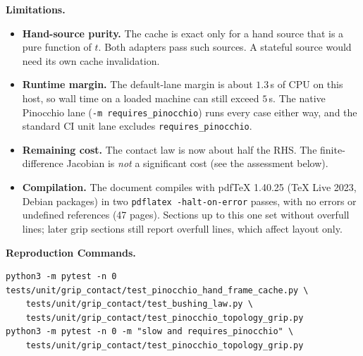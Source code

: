 \documentclass[11pt,a4paper]{article}
\begin{document}
\textbf{Limitations.}
\begin{itemize}[leftmargin=*,noitemsep]
\item \textbf{Hand-source purity.} The cache is exact only for a hand source that is a pure function of $t$. Both
  adapters pass such sources. A stateful source would need its own cache invalidation.
\item \textbf{Runtime margin.} The default-lane margin is about $1.3$\,s of CPU on this host, so wall time on a loaded
  machine can still exceed $5$\,s. The native Pinocchio lane (\texttt{-m requires\_pinocchio}) runs every case either
  way, and the standard CI unit lane excludes \texttt{requires\_pinocchio}.
\item \textbf{Remaining cost.} The contact law is now about half the RHS. The finite-difference Jacobian is
  \emph{not} a significant cost (see the assessment below).
\item \textbf{Compilation.} The document compiles with pdfTeX 1.40.25 (TeX Live 2023, Debian packages) in two
  \texttt{pdflatex -halt-on-error} passes, with no errors or undefined references (47 pages). Sections up to this
  one set without overfull lines; later grip sections still report overfull lines, which affect layout only.
\end{itemize}

\textbf{Reproduction Commands.}
\begin{verbatim}
python3 -m pytest -n 0 tests/unit/grip_contact/test_pinocchio_hand_frame_cache.py \
    tests/unit/grip_contact/test_bushing_law.py \
    tests/unit/grip_contact/test_pinocchio_topology_grip.py
python3 -m pytest -n 0 -m "slow and requires_pinocchio" \
    tests/unit/grip_contact/test_pinocchio_topology_grip.py
\end{verbatim}
\end{document}
